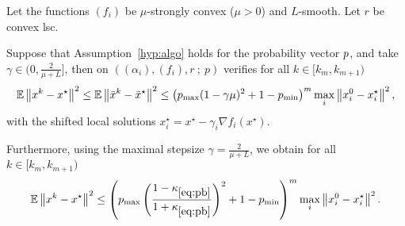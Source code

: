 \begin{theorem}\label{lm:spy_diff}
Let the functions $(f_i)$ be $\mu$-strongly convex ($\mu>0$) and $L$-smooth. Let $r$ be convex lsc. 

Suppose that Assumption~\ref{hyp:algo} holds for the probability vector ${p}$, and take $\gamma \in (0, \frac{2}{\mu + L}]$,  then \salgo on $((\alpha_i),(f_i), r  ~ ; ~  p)$ verifies for all $k\in [k_m, k_{m+1})$
\begin{align}
\label{eq:dif_prob}
   \mathbb{E} \left\| x^k - x^\star \right\|^2 \le\mathbb{E} \left\| \bar{x}^k - \bar{x}^\star \right\|^2 \le\left( p_{\max} (1 - \gamma \mu)^2 + 1 - p_{\min}  \right)^{m} \max_i\left\|x_i^0-x_i^\star\right\|^2,
\end{align}
with the shifted local solutions $x_i^\star = x^\star - \gamma_i\nabla f_i(x^\star)$. 

Furthermore, using the maximal stepsize $\gamma = \frac{2}{\mu + L}$, we obtain for all $k\in [k_m, k_{m+1})$
\begin{align}
\label{eq:ratebefore}
 \mathbb{E}   \left\| x^k - x^\star \right\|^2 \le \left( p_{\max} \left(\frac{1-\kappa_{\eqref{eq:pb}}}{1+\kappa_{\eqref{eq:pb}}}\right)^2 + 1 - p_{\min}  \right)^{m} \max_i\left\|x_i^0-x_i^\star\right\|^2.
\end{align}
\end{theorem}

